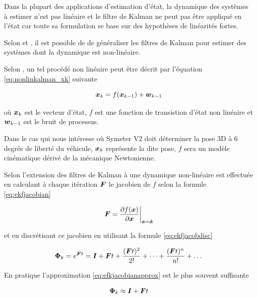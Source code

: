 \documentclass[12pt,a4paper]{report}
\begin{document}
	Dans la plupart des applications d'estimation d'état, la dynamique des systèmes à estimer n'est pas linéaire et le filtre de Kalman ne peut pas être appliqué en l'état car toute sa formulation se base sur des hypothèses de linéarités fortes.
	
	\para Selon \cite{menegatti_generalized_2016} et \cite{zarchan_fundamentals_2009}, il est possible de de généraliser les filtres de Kalman pour estimer des systèmes dont la dynamique est non-linéaire.
	
	\para Selon \cite{menegatti_generalized_2016}, un tel procédé non linéaire peut être décrit par l'équation \ref{eq:nonlinkalman_xk} suivante
	
	\begin{equation}
	\label{eq:nonlinkalman_xk}
	\boldsymbol{x}_k = f(\boldsymbol{x}_{k-1}) + \boldsymbol{w}_{k-1}
	\end{equation}
	
	où $\boldsymbol{x}_k$ est le vecteur d'état, $f$ est une fonction de transistion d'état non linéaire et $\boldsymbol{w}_{k-1}$ est le bruit de processus.
	
	\para Dans le cas qui nous intéresse où Symeter V2 doit déterminer la pose 3D à 6 degrés de liberté du véhicule, $\boldsymbol{x}_k$ représente la dite pose, $f$ sera un modèle cinématique dérivé de la mécanique Newtonienne.
	
	\para Selon \cite{zarchan_fundamentals_2009} l'extension des filtres de Kalman à une dynamique non-linéaire est effectuée en calculant à chaque itération $\boldsymbol{F}$ le jacobien de $f$ selon la formule \ref{eq:ekfjacobian}
	
	\begin{equation}
	\label{eq:ekfjacobian}
	\boldsymbol{F} = \frac{\partial f(\boldsymbol{x})}{\partial \boldsymbol{x}} \bigg\rvert_{\boldsymbol{x}= \boldsymbol{\hat{x}}}
	\end{equation}
	
	\para et en discrétisant ce jacobien en utilisant la formule \ref{eq:ekfjacobdisc}
	
	\begin{equation}
	\label{eq:ekfjacobdisc}
	\boldsymbol{\Phi}_k = e^{\boldsymbol Ft} = \boldsymbol I + \boldsymbol Ft + \frac{(\boldsymbol Ft)^2}{2!} + \dots + \frac{(\boldsymbol Ft)^n}{n!} + \dots
	\end{equation}
	
	\para En pratique l'approximation \ref{eq:efkjacobianapprox} est le plus souvent suffisante
	
	\begin{equation}
	\label{eq:efkjacobianapprox}
	\boldsymbol{\Phi}_k \approx \boldsymbol I + \boldsymbol Ft
	\end{equation}
	
\end{document}
